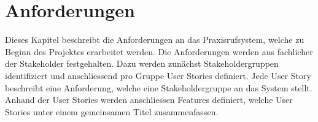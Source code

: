 \section{Anforderungen}\label{sec:anforderungen}

Dieses Kapitel beschreibt die Anforderungen an das Praxisrufsystem, welche zu Beginn des Projektes erarbeitet werden.
Die Anforderungen werden aus fachlicher der Stakeholder festgehalten.
Dazu werden zunächst Stakeholdergruppen identifiziert und anschliessend pro Gruppe User Stories definiert.
Jede User Story beschreibt eine Anforderung, welche eine Stakeholdergruppe an das System stellt.
Anhand der User Stories werden anschliessen Features definiert, welche User Stories unter einem gemeinsamen Titel zusammenfassen.



